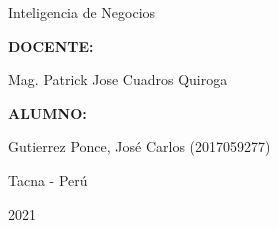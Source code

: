 \documentclass[12pt,letterpaper]{article}
\begin{document}
\begin{titlepage}
\begin{center}
\begin{large}
                Inteligencia de Negocios\\
            \end{large}
            \vspace*{0.2in}
            \begin{Large}
                \textbf{DOCENTE:} \\
            \end{Large}
            \vspace*{0.1in}
            \begin{large}
                Mag. Patrick Jose Cuadros Quiroga\\
            \end{large}
            \vspace*{0.3in}
            \begin{large}
                \textbf{ALUMNO:} \\
                \begin{flushleft}
                    Gutierrez Ponce, José Carlos  		\hfill	(2017059277) \\
                \end{flushleft}
            \end{large}
            \vspace*{1.3in}
            \begin{large}
                Tacna - Perú\\
            \end{large}
            \vspace*{0.1in}
            \begin{large}
                2021\\
            \end{large}
        \end{center}
    \end{titlepage}
    
    \newpage
    \tableofcontents
    \justify
\end{document}
